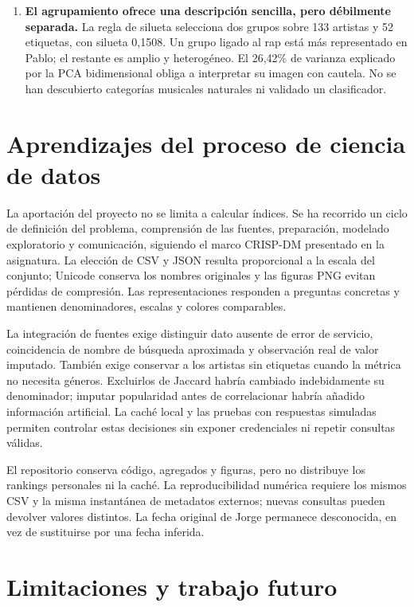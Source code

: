 \begin{enumerate}
    \item \textbf{El agrupamiento ofrece una descripción sencilla, pero débilmente separada.} La regla de silueta selecciona dos grupos sobre 133 artistas y 52 etiquetas, con silueta 0,1508. Un grupo ligado al rap está más representado en Pablo; el restante es amplio y heterogéneo. El 26,42\% de varianza explicado por la PCA bidimensional obliga a interpretar su imagen con cautela. No se han descubierto categorías musicales naturales ni validado un clasificador.
\end{enumerate}

\section{Aprendizajes del proceso de ciencia de datos}
\label{sec:conclusiones-datos}

La aportación del proyecto no se limita a calcular índices. Se ha recorrido un ciclo de definición del problema, comprensión de las fuentes, preparación, modelado exploratorio y comunicación, siguiendo el marco CRISP-DM presentado en la asignatura. La elección de CSV y JSON resulta proporcional a la escala del conjunto; Unicode conserva los nombres originales y las figuras PNG evitan pérdidas de compresión. Las representaciones responden a preguntas concretas y mantienen denominadores, escalas y colores comparables.

La integración de fuentes exige distinguir dato ausente de error de servicio, coincidencia de nombre de búsqueda aproximada y observación real de valor imputado. También exige conservar a los artistas sin etiquetas cuando la métrica no necesita géneros. Excluirlos de Jaccard habría cambiado indebidamente su denominador; imputar popularidad antes de correlacionar habría añadido información artificial. La caché local y las pruebas con respuestas simuladas permiten controlar estas decisiones sin exponer credenciales ni repetir consultas válidas.

El repositorio conserva código, agregados y figuras, pero no distribuye los rankings personales ni la caché. La reproducibilidad numérica requiere los mismos CSV y la misma instantánea de metadatos externos; nuevas consultas pueden devolver valores distintos. La fecha original de Jorge permanece desconocida, en vez de sustituirse por una fecha inferida.

\section{Limitaciones y trabajo futuro}
\label{sec:limitaciones}

